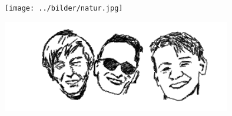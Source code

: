 \begin{intersong}
\begin{center}
\texttt{[image: ../bilder/natur.jpg]} 
\end{center}
\end{intersong}
\sclearpage

\sclearpage

\begin{intersong}
	\begin{center}
		\includegraphics[width=0.75\textwidth]{../bilder/fardigabilder/CamillasFardigaBilder/humorgruppenKAJ.png} 
	\end{center}
\end{intersong}

\sclearpage

%